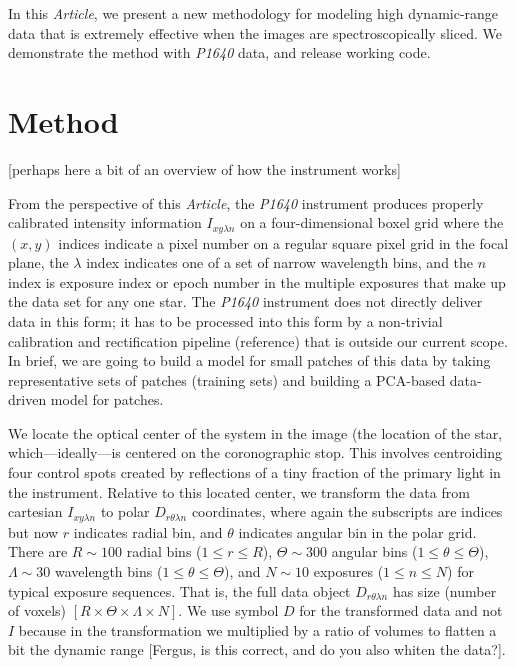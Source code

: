 \documentclass[12pt,pdftex,preprint]{aastex}
\newcommand{\documentname}{\textsl{Article}}
\newcommand{\project}[1]{\textsl{#1}}
\begin{document}
In this \documentname, we present a new methodology for modeling high
dynamic-range data that is extremely effective when the images are
spectroscopically sliced.  We demonstrate the method with
\project{P1640} data, and release working code.

\section{Method}

[perhaps here a bit of an overview of how the instrument works]

From the perspective of this \documentname, the \project{P1640}
instrument produces properly calibrated intensity information $I_{x y
  \lambda n}$ on a four-dimensional boxel grid where the $(x, y)$
indices indicate a pixel number on a regular square pixel grid in the
focal plane, the $\lambda$ index indicates one of a set of narrow
wavelength bins, and the $n$ index is exposure index or epoch number
in the multiple exposures that make up the data set for any one star.
The \project{P1640} instrument does not directly deliver data in this
form; it has to be processed into this form by a non-trivial
calibration and rectification pipeline (reference) that is outside our
current scope.  In brief, we are going to build a model for small
patches of this data by taking representative sets of patches
(training sets) and building a PCA-based data-driven model for
patches.

We locate the optical center of the system in the image (the location
of the star, which---ideally---is centered on the coronographic stop.
This involves centroiding four control spots created by reflections of
a tiny fraction of the primary light in the instrument.  Relative to
this located center, we transform the data from cartesian $I_{x y
  \lambda n}$ to polar $D_{r \theta \lambda n}$ coordinates, where
again the subscripts are indices but now $r$ indicates radial bin, and
$\theta$ indicates angular bin in the polar grid.  There are $R\sim
100$ radial bins ($1\leq r\leq R$), $\Theta\sim 300$ angular bins
($1\leq\theta\leq\Theta$), $\Lambda\sim 30$ wavelength bins
($1\leq\theta\leq\Theta$), and $N\sim 10$ exposures ($1\leq
n\leq N$) for typical exposure sequences.  That is, the full data
object $D_{r \theta \lambda n}$ has size (number of voxels)
$[R\times\Theta\times\Lambda\times N]$.  We use symbol $D$ for the
transformed data and not $I$ because in the transformation we
multiplied by a ratio of volumes to flatten a bit the dynamic range
[Fergus, is this correct, and do you also whiten the data?].
\end{document}
